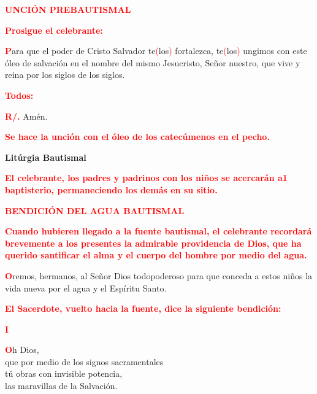 \documentclass[12pt, letterpaper]{report}
\begin{document}
\Large {\bfseries \textcolor{red}{UNCI\'ON PREBAUTISMAL}} 

\large {\bfseries \textcolor{red}{Prosigue el celebrante:}}

\lettrine[lines=1]{\bfseries \textcolor{red}{P}}{}\Large ara que el poder de Cristo Salvador te\textcolor{red}{(}los\textcolor{red}{)} fortalezca, te\textcolor{red}{(}los\textcolor{red}{)} ungimos con este \'oleo de salvaci\'on en el nombre del mismo Jesucristo, Se\~nor nuestro, que vive y reina por los siglos de los siglos.

\large {\bfseries \textcolor{red}{Todos:}}

\noindent
\Large {\bfseries \textcolor{red}{R/.}} \hspace{0.5cm} Am\'en.

\large {\bfseries \textcolor{red}{Se hace la unci\'on con el \'oleo de los catec\'umenos en el pecho.}}

\newpage

\begin{center}
\Huge {\bfseries Lit\'urgia Bautismal}
\end{center}

\large {\bfseries \textcolor{red}{El celebrante, los padres y padrinos con los ni\~nos se acercar\'an a1 baptisterio, permaneciendo los dem\'as en su sitio.}} 

\Large {\bfseries \textcolor{red}{BENDICI\'ON DEL AGUA BAUTISMAL}} 

\large {\bfseries \textcolor{red}{Cuando hubieren llegado a la fuente bautismal, el celebrante recordar\'a brevemente a los presentes la admirable providencia de Dios, que ha querido santificar el alma y el cuerpo del hombre por medio del agua.}} 

\lettrine[lines=1]{\bfseries \textcolor{red}{O}}{}\Large remos, hermanos, al Se\~nor Dios todopoderoso para que conceda a estos ni\~nos la vida nueva por el agua y el Esp\'iritu Santo.

\large {\bfseries \textcolor{red}{El Sacerdote, vuelto hacia la fuente, dice la siguiente bendici\'on:}}

\begin{center}
\Large {\bfseries \textcolor{red}{I}} 
\end{center}

\lettrine[lines=1]{\bfseries \textcolor{red}{O}}{}\Large h Dios,\\ que por medio de los signos sacramentales\\ t\'u obras con invisible potencia,\\ las maravillas de la Salvaci\'on.
\end{document}
